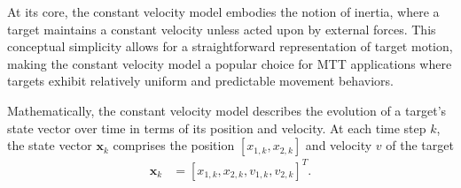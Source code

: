 At its core, the constant velocity model embodies the notion of inertia, where a target maintains a constant velocity unless acted upon by external forces. This conceptual simplicity allows for a straightforward representation of target motion, making the constant velocity model a popular choice for MTT applications where targets exhibit relatively uniform and predictable movement behaviors.

Mathematically, the constant velocity model describes the evolution of a target's state vector over time in terms of
its position and velocity. At each time step $k$, the state vector $\mathbf{x}_k$ comprises the position $[x_{1,k},x_{
    2,k}]$ and velocity $v$ of the target
\begin{align}
    \mathbf{x}_k &= [x_{1,k}, x_{2,k}, v_{1,k}, v_{2,k}]^T.
\end{align}


